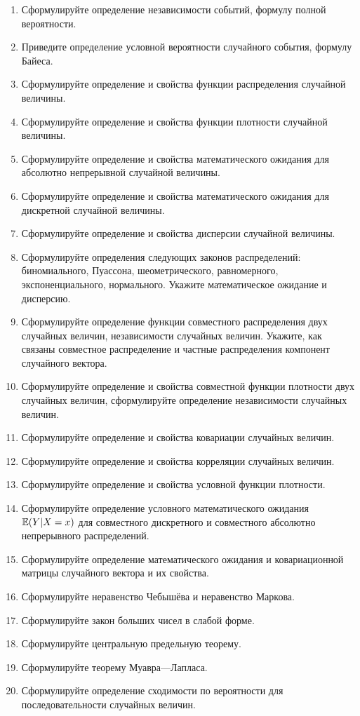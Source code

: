 \begin{enumerate}
\item Сформулируйте определение независимости событий, формулу полной вероятности.
\item Приведите определение условной вероятности случайного события, формулу Байеса.
\item Сформулируйте определение и свойства функции распределения случайной величины.
\item Сформулируйте определение и свойства функции плотности случайной величины.
\item Сформулируйте определение и свойства математического ожидания для абсолютно непрерывной случайной величины.
\item Сформулируйте определение и свойства математического ожидания для дискретной случайной величины.
\item Сформулируйте определение и свойства дисперсии случайной величины.
\item Сформулируйте определения следующих законов распределений: биномиального, Пуассона, шеометрического, равномерного, экспоненциального, нормального. Укажите математическое ожидание и дисперсию.
\item Сформулируйте определение функции совместного распределения двух случайных величин, независимости случайных величин. Укажите, как связаны совместное распределение и частные распределения компонент случайного вектора.
\item	Сформулируйте определение и свойства совместной функции плотности двух случайных величин, сформулируйте определение независимости случайных величин.
\item Сформулируйте определение и свойства ковариации случайных величин.
\item Сформулируйте определение и свойства корреляции случайных величин.
\item Сформулируйте определение и свойства условной функции плотности.
\item Сформулируйте определение  условного математического ожидания $\mathbb{E}(Y|X=x)$ для совместного дискретного и совместного абсолютно непрерывного распределений.
\item Сформулируйте определение математического ожидания и ковариационной матрицы случайного вектора и их свойства.
\item Сформулируйте неравенство Чебышёва и неравенство Маркова.
\item Сформулируйте закон больших чисел в слабой форме.
\item Сформулируйте центральную предельную теорему.
\item Сформулируйте теорему Муавра—Лапласа.
\item Сформулируйте определение сходимости по вероятности для последовательности случайных величин.

\end{enumerate}


